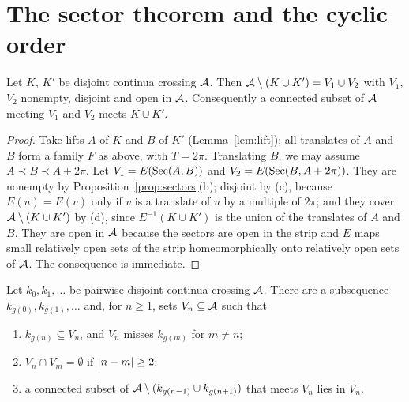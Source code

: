 
\section{The sector theorem and the cyclic order}

\begin{theorem}\label{thm:sector}
Let $K$, $K'$ be disjoint continua crossing $\mathcal{A}$. Then $\mathcal{A}\setminus(K\cup K')=V_1\cup V_2$ with $V_1$, $V_2$ nonempty, disjoint and open in $\mathcal{A}$. Consequently a connected
subset of $\mathcal{A}$ meeting $V_1$ and $V_2$ meets $K\cup K'$.
\end{theorem}

\begin{proof}
Take lifts $A$ of $K$ and $B$ of $K'$ (Lemma~\ref{lem:lift}); all translates of $A$ and $B$ form a family $F$ as above, with $T=2\pi$. Translating $B$, we may assume $A\prec B\prec
A+2\pi$. Let $V_1=E(\operatorname{Sec}(A,B))$ and $V_2=E(\operatorname{Sec}(B,A+2\pi))$. They are nonempty by Proposition~\ref{prop:sectors}(b); disjoint by (c), because $E(u)=E(v)$ only if $v$ is a translate of $u$
by a multiple of $2\pi$; and they cover $\mathcal{A}\setminus(K\cup K')$ by (d), since $E^{-1}(K\cup K')$ is the union of the translates of $A$ and $B$. They are open in $\mathcal{A}$ because the sectors
are open in the strip and $E$ maps small relatively open sets of the strip homeomorphically onto relatively open sets of $\mathcal{A}$. The consequence is immediate.
\end{proof}


\begin{theorem}\label{thm:cyclic}
Let $k_0,k_1,\dots$ be pairwise disjoint continua crossing $\mathcal{A}$. There are a subsequence $k_{g(0)},k_{g(1)},\dots$ and, for $n\ge1$, sets $V_n\subseteq\mathcal{A}$ such that
\begin{enumerate}[label=(\roman*)]
\item $k_{g(n)}\subseteq V_n$, and $V_n$ misses $k_{g(m)}$ for $m\ne n$;
\item $V_n\cap V_m=\emptyset$ if $\left\lvert n-m\right\rvert\ge2$;
\item a connected subset of $\mathcal{A}\setminus(k_{g(n-1)}\cup k_{g(n+1)})$ that meets $V_n$ lies in $V_n$.
\end{enumerate}
\end{theorem}

